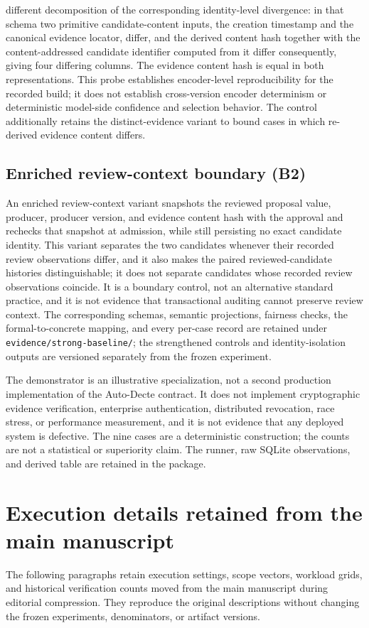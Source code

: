 \documentclass[preprint,12pt,authoryear]{elsarticle}
\newcommand{\code}[1]{\nolinkurl{#1}}
\begin{document}
different decomposition of the corresponding identity-level divergence: in that schema two primitive
candidate-content inputs, the creation timestamp and the canonical evidence locator, differ, and the
derived content hash together with the content-addressed candidate identifier computed from it differ
consequently, giving four differing columns. The evidence content hash is equal in both
representations. This probe
establishes encoder-level reproducibility for the recorded build; it does not
establish cross-version encoder determinism or deterministic model-side
confidence and selection behavior. The control additionally retains the
distinct-evidence variant to bound cases in which re-derived evidence content
differs.

\subsection{Enriched review-context boundary (B2)}
\label{app:review-context-boundary}

An enriched review-context variant snapshots the reviewed proposal value,
producer, producer version, and evidence content hash with the approval and
rechecks that snapshot at admission, while still persisting no exact candidate
identity. This variant separates the two candidates whenever their recorded
review observations differ, and it also makes the paired reviewed-candidate
histories distinguishable; it does not separate candidates whose recorded review
observations coincide. It is a boundary control, not an alternative standard
practice, and it is not evidence that transactional auditing cannot preserve
review context. The corresponding schemas, semantic projections, fairness checks,
the formal-to-concrete mapping, and every per-case record are retained under
\code{evidence/strong-baseline/}; the strengthened controls and identity-isolation
outputs are versioned separately from the frozen experiment.

The demonstrator is an illustrative specialization, not a second production
implementation of the Auto-Decte contract. It does not implement cryptographic
evidence verification, enterprise authentication, distributed revocation, race
stress, or performance measurement, and it is not evidence that any deployed
system is defective. The nine cases are a deterministic construction; the
counts are not a statistical or superiority claim. The runner, raw SQLite
observations, and derived table are retained in the package.
\section{Execution details retained from the main manuscript}
\label{sec:editorial-reproduction-details}
The following paragraphs retain execution settings, scope vectors, workload grids,
and historical verification counts moved from the main manuscript during editorial
compression. They reproduce the original descriptions without changing the frozen
experiments, denominators, or artifact versions.

\end{document}
